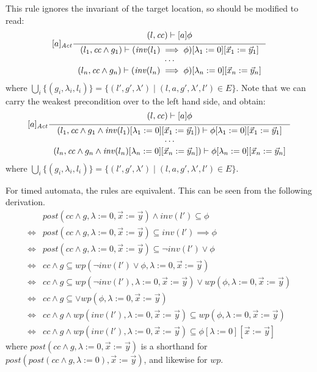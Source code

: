 \documentclass{article}
\newcommand{\proofrule}[3][]{#1 \frac{\raisebox{.7ex}{\normalsize{$#2$}}}
  {\raisebox{-1.0ex}{\normalsize{$#3$}}}}
\newcommand{\loc}{l}
\newcommand{\region}{\mathit{cc}}
\newcommand{\inv}{\mathit{inv}}
\newcommand{\post}{\mathit{post}}
\newcommand{\wpre}{\mathit{wp}}
\begin{document}
This rule ignores the invariant of the target location, so should be modified to read:
\[
\proofrule[{[a]_{\mathit{Act}}}]
{(\loc, \region) \vdash [a]\phi}
{
\begin{array}{c}
  (\loc_1, \region \land g_1) \vdash (\inv(\loc_1) \implies \phi){[\lambda_1 := 0][\vec{x}_1 := \vec{y}_1]} \\
 \cdots \\
(\loc_n, \region \land g_n) \vdash (\inv(\loc_n) \implies \phi){[\lambda_n := 0][\vec{x}_n := \vec{y}_n]}
\end{array}
}
\]
where $\bigcup_i \{ (g_i,\lambda_i,\loc_i) \} = \{ (\loc', g', \lambda') \mid (\loc, a, g', \lambda', \loc') \in E \}$. 
Note that we can carry the weakest precondition over to the left hand side, and obtain:
\[
\proofrule[{[a]_{\mathit{Act}}}]
{(\loc, \region) \vdash [a]\phi}
{
\begin{array}{c}
 (\loc_1, \region \land g_1 \land \inv(\loc_1)[\lambda_1 := 0][\vec{x}_1 := \vec{y}_1]) \vdash \phi{[\lambda_1 := 0][\vec{x}_1 := \vec{y}_1]} \\
\cdots \\
(\loc_n, \region \land g_n \land \inv(\loc_n)[\lambda_n := 0][\vec{x}_n := \vec{y}_n]) \vdash \phi{[\lambda_n := 0][\vec{x}_n := \vec{y}_n]}
\end{array}
}
\]
where $\bigcup_i \{ (g_i,\lambda_i,\loc_i) \} = \{ (\loc', g', \lambda') \mid (\loc, a, g', \lambda', \loc') \in E \}$.

For timed automata, the rules are equivalent. This can be seen from the following derivation.
\begin{align*}
  & \post(\region \land g, \lambda := 0, \vec{x} := \vec{y}) \land \inv(\loc') \subseteq \phi \\
\iff & \post(\region \land g, \lambda := 0, \vec{x} := \vec{y}) \subseteq \inv(\loc') \implies \phi \\
\iff & \post(\region \land g, \lambda := 0, \vec{x} := \vec{y}) \subseteq \lnot \inv(\loc') \lor \phi \\
\iff & \region \land g \subseteq \wpre(\lnot \inv(\loc') \lor \phi, \lambda := 0, \vec{x} := \vec{y})\\
\iff & \region \land g \subseteq \wpre(\lnot \inv(\loc'), \lambda := 0, \vec{x} := \vec{y}) \lor \wpre(\phi, \lambda := 0, \vec{x} := \vec{y})\\
\iff & \region \land g \subseteq \lor \wpre(\phi, \lambda := 0, \vec{x} := \vec{y})\\
\iff & \region \land g \land \wpre(\inv(\loc'), \lambda := 0, \vec{x} := \vec{y}) \subseteq \wpre(\phi, \lambda := 0, \vec{x} := \vec{y}) \\
\iff & \region \land g \land \wpre(\inv(\loc'), \lambda := 0, \vec{x} := \vec{y}) \subseteq \phi[\lambda := 0][\vec{x} := \vec{y}]
\end{align*}
where $\post(\region \land g, \lambda := 0, \vec{x} := \vec{y})$ is a shorthand for $\post(\post(\region \land g, \lambda := 0), \vec{x} := \vec{y})$, and likewise for $\wpre$.
\end{document}
